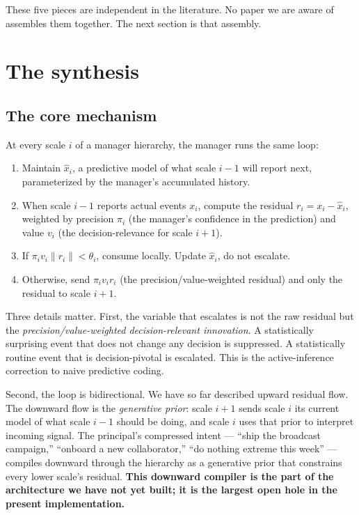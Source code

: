 \documentclass[11pt]{article}
\begin{document}
These five pieces are independent in the literature. No paper we are aware of assembles them together. The next section is that assembly.

\section{The synthesis}

\subsection{The core mechanism}

At every scale $i$ of a manager hierarchy, the manager runs the same loop:
\begin{enumerate}[leftmargin=2em, itemsep=0.2em]
  \item Maintain $\hat{x}_i$, a predictive model of what scale $i-1$ will report next, parameterized by the manager's accumulated history.
  \item When scale $i-1$ reports actual events $x_i$, compute the residual $r_i = x_i - \hat{x}_i$, weighted by precision $\pi_i$ (the manager's confidence in the prediction) and value $v_i$ (the decision-relevance for scale $i+1$).
  \item If $\pi_i v_i \|r_i\| < \theta_i$, consume locally. Update $\hat{x}_i$, do not escalate.
  \item Otherwise, send $\pi_i v_i r_i$ (the precision/value-weighted residual) and only the residual to scale $i+1$.
\end{enumerate}

Three details matter. First, the variable that escalates is not the raw residual but the \emph{precision/value-weighted decision-relevant innovation}. A statistically surprising event that does not change any decision is suppressed. A statistically routine event that is decision-pivotal is escalated. This is the active-inference correction to naive predictive coding.

Second, the loop is bidirectional. We have so far described upward residual flow. The downward flow is the \emph{generative prior}: scale $i+1$ sends scale $i$ its current model of what scale $i-1$ should be doing, and scale $i$ uses that prior to interpret incoming signal. The principal's compressed intent --- ``ship the broadcast campaign,'' ``onboard a new collaborator,'' ``do nothing extreme this week'' --- compiles downward through the hierarchy as a generative prior that constrains every lower scale's residual. \textbf{This downward compiler is the part of the architecture we have not yet built; it is the largest open hole in the present implementation.}
\end{document}

